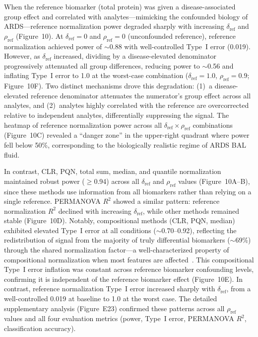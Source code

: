 \documentclass[12pt]{article}
\begin{document}
When the reference biomarker (total protein) was given a disease-associated group effect and correlated with analytes---mimicking the confounded biology of ARDS---reference normalization power degraded sharply with increasing $\delta_{\text{ref}}$ and $\rho_{\text{ref}}$ (Figure~10). At $\delta_{\text{ref}} = 0$ and $\rho_{\text{ref}} = 0$ (unconfounded reference), reference normalization achieved power of $\sim$0.88 with well-controlled Type~I error (0.019). However, as $\delta_{\text{ref}}$ increased, dividing by a disease-elevated denominator progressively attenuated all group differences, reducing power to $\sim$0.56 and inflating Type~I error to 1.0 at the worst-case combination ($\delta_{\text{ref}} = 1.0$, $\rho_{\text{ref}} = 0.9$; Figure~10F). Two distinct mechanisms drove this degradation: (1)~a disease-elevated reference denominator attenuates the numerator's group effect across all analytes, and (2)~analytes highly correlated with the reference are overcorrected relative to independent analytes, differentially suppressing the signal. The heatmap of reference normalization power across all $\delta_{\text{ref}} \times \rho_{\text{ref}}$ combinations (Figure~10C) revealed a ``danger zone'' in the upper-right quadrant where power fell below 50\%, corresponding to the biologically realistic regime of ARDS BAL fluid.

In contrast, CLR, PQN, total sum, median, and quantile normalization maintained robust power ($\geq$0.94) across all $\delta_{\text{ref}}$ and $\rho_{\text{ref}}$ values (Figure~10A--B), since these methods use information from all biomarkers rather than relying on a single reference. PERMANOVA $R^2$ showed a similar pattern: reference normalization $R^2$ declined with increasing $\delta_{\text{ref}}$, while other methods remained stable (Figure~10D). Notably, compositional methods (CLR, PQN, median) exhibited elevated Type~I error at all conditions ($\sim$0.70--0.92), reflecting the redistribution of signal from the majority of truly differential biomarkers ($\sim$69\%) through the shared normalization factor---a well-characterized property of compositional normalization when most features are affected~\cite{Mandal2015}. This compositional Type~I error inflation was constant across reference biomarker confounding levels, confirming it is independent of the reference biomarker effect (Figure~10E). In contrast, reference normalization Type~I error increased sharply with $\delta_{\text{ref}}$, from a well-controlled 0.019 at baseline to 1.0 at the worst case. The detailed supplementary analysis (Figure~E23) confirmed these patterns across all $\rho_{\text{ref}}$ values and all four evaluation metrics (power, Type~I error, PERMANOVA $R^2$, classification accuracy).
\end{document}
